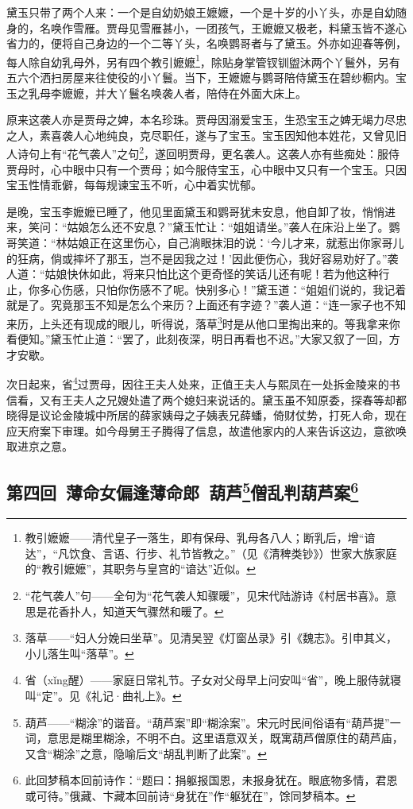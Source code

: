 \par 黛玉只带了两个人来：一个是自幼奶娘王嬷嬷，一个是十岁的小丫头，亦是自幼随身的，名唤作雪雁。贾母见雪雁甚小，一团孩气，王嬷嬷又极老，料黛玉皆不遂心省力的，便将自己身边的一个二等丫头，名唤鹦哥者与了黛玉。外亦如迎春等例，每人除自幼乳母外，另有四个教引嬷嬷\footnote{教引嬷嬷——清代皇子一落生，即有保母、乳母各八人；断乳后，增“谙达”，“凡饮食、言语、行步、礼节皆教之。”（见《清稗类钞》）世家大族家庭的“教引嬷嬷”，其职务与皇宫的“谙达”近似。}，除贴身掌管钗钏盥沐两个丫鬟外，另有五六个洒扫房屋来往使役的小丫鬟。当下，王嬷嬷与鹦哥陪侍黛玉在碧纱橱内。宝玉之乳母李嬷嬷，并大丫鬟名唤袭人者，陪侍在外面大床上。
\par 原来这袭人亦是贾母之婢，本名珍珠。贾母因溺爱宝玉，生恐宝玉之婢无竭力尽忠之人，素喜袭人心地纯良，克尽职任，遂与了宝玉。宝玉因知他本姓花，又曾见旧人诗句上有“花气袭人”之句\footnote{“花气袭人”句——全句为“花气袭人知骤暖”，见宋代陆游诗《村居书喜》。意思是花香扑人，知道天气骤然和暖了。}，遂回明贾母，更名袭人。这袭人亦有些痴处：服侍贾母时，心中眼中只有一个贾母；如今服侍宝玉，心中眼中又只有一个宝玉。只因宝玉性情乖僻，每每规谏宝玉不听，心中着实忧郁。
\par 是晚，宝玉李嬷嬷已睡了，他见里面黛玉和鹦哥犹未安息，他自卸了妆，悄悄进来，笑问：“姑娘怎么还不安息？”黛玉忙让：“姐姐请坐。”袭人在床沿上坐了。鹦哥笑道：“林姑娘正在这里伤心，自己淌眼抹泪的说：‘今儿才来，就惹出你家哥儿的狂病，倘或摔坏了那玉，岂不是因我之过！’因此便伤心，我好容易劝好了。”袭人道：“姑娘快休如此，将来只怕比这个更奇怪的笑话儿还有呢！若为他这种行止，你多心伤感，只怕你伤感不了呢。快别多心！”黛玉道：“姐姐们说的，我记着就是了。究竟那玉不知是怎么个来历？上面还有字迹？”袭人道：“连一家子也不知来历，上头还有现成的眼儿，听得说，落草\footnote{ 落草——“妇人分娩曰坐草”。见清吴翌《灯窗丛录》引《魏志》。引申其义，小儿落生叫“落草”。}时是从他口里掏出来的。等我拿来你看便知。”黛玉忙止道：“罢了，此刻夜深，明日再看也不迟。”大家又叙了一回，方才安歇。
\par 次日起来，省\footnote{省（xǐng醒）——家庭日常礼节。子女对父母早上问安叫“省”，晚上服侍就寝叫“定”。见《礼记·曲礼上》。}过贾母，因往王夫人处来，正值王夫人与熙凤在一处拆金陵来的书信看，又有王夫人之兄嫂处遣了两个媳妇来说话的。黛玉虽不知原委，探春等却都晓得是议论金陵城中所居的薛家姨母之子姨表兄薛蟠，倚财仗势，打死人命，现在应天府案下审理。如今母舅王子腾得了信息，故遣他家内的人来告诉这边，意欲唤取进京之意。


\subsection*{第四回\ 薄命女偏逢薄命郎\ 葫芦\footnote{葫芦——“糊涂”的谐音。“葫芦案”即“糊涂案”。宋元时民间俗语有“葫芦提”一词，意思是糊里糊涂，不明不白。这里语意双关，既寓葫芦僧原住的葫芦庙，又含“糊涂”之意，隐喻后文“胡乱判断了此案”。}僧乱判葫芦案\footnote{此回梦稿本回前诗作：“题曰：捐躯报国恩，未报身犹在。眼底物多情，君恩或可待。”俄藏、卞藏本回前诗“身犹在”作“躯犹在”，馀同梦稿本。}}


